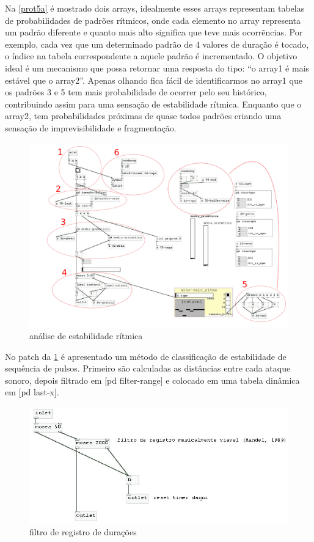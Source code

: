 \documentclass[draft]{ppgmus}
\begin{document}
Na \ref{prot5a} é mostrado dois arrays, idealmente esses arrays representam tabelas
de probabilidades de padrões rítmicos, onde cada elemento no array representa um
padrão diferente e quanto mais alto significa que teve mais ocorrẽncias.
Por exemplo, cada vez que um determinado padrão de 4 valores de duração é tocado, 
o índice na tabela correspondente a aquele padrão é incrementado. O objetivo ideal
é um mecanismo que possa retornar uma resposta do tipo:
``o array1 é mais estável que o array2''. Apenas olhando fica fácil de identificarmos
no array1 que os padrões 3 e 5 tem mais probabilidade de ocorrer pelo seu histórico,
contribuindo assim para uma sensação de estabilidade rítmica. Enquanto que o array2,
tem probabilidades próximas de quase todos padrões criando uma sensação de imprevisibilidade
e fragmentação.


\begin{figure}
\includegraphics[scale=.5]{sinc-calc-ritmo}
\caption{análise de estabilidade rítmica}
\label{[sinc-calc-ritmo]}
\end{figure}

No patch da \ref{[sinc-calc-ritmo]} é apresentado um método de classificação de estabilidade
de sequência de pulsos. Primeiro são calculadas as distâncias entre cada ataque
sonoro, depois filtrado em [pd filter-range] e colocado em uma tabela dinâmica em
[pd last-x]. 


\begin{figure}
\includegraphics[scale=.6]{sinc-calc-ritmo1}
\caption{filtro de registro de durações}
\label{[sinc-calc-ritmo1]}
\end{figure}
\end{document}
